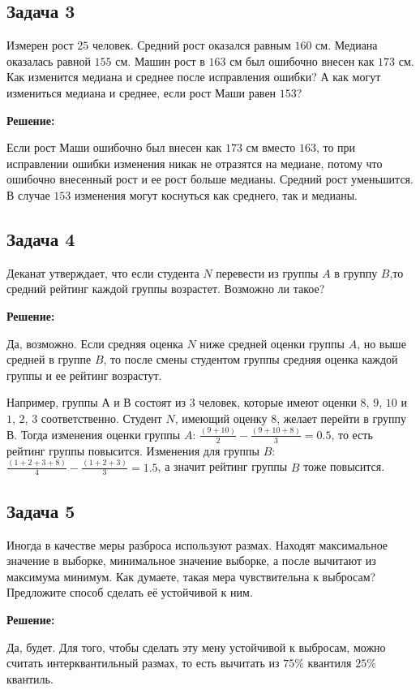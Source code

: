 \documentclass[12pt, a4paper, oneside]{article}
\begin{document}
\subsection*{Задача 3}

Измерен рост $25$ человек. Средний рост оказался равным $160$ см. Медиана оказалась равной $155$ см. Машин рост в $163$ см был ошибочно внесен как $173$ см. Как изменится медиана и среднее после исправления ошибки? А как могут измениться медиана и среднее, если рост Маши равен $153$?

\textbf{Решение:} 

Если рост Маши ошибочно был внесен как $173$ см вместо $163$, то при исправлении ошибки изменения никак не отразятся на медиане, потому что ошибочно внесенный рост и ее рост больше медианы. Средний рост уменьшится. В случае $153$ изменения могут коснуться как среднего, так и медианы. 


\subsection*{Задача 4}

Деканат утверждает, что если студента $N$ перевести из группы $A$ в группу $B$,то средний рейтинг каждой группы возрастет. Возможно ли такое?

\textbf{Решение:} 

Да, возможно. Если средняя оценка $N$ ниже средней оценки группы $A$, но выше средней в группе $B$, то после смены студентом группы средняя оценка каждой группы и ее рейтинг возрастут.

Например, группы $А$ и $В$ состоят из $3$ человек, которые имеют оценки $8$, $9$, $10$ и $1$, $2$, $3$ соответственно. Студент $N$, имеющий оценку $8$, желает перейти в группу $В$. Тогда изменения оценки группы $A$:  $\frac{(9+10)}{2} - \frac{(9+10+8)}{3} = 0.5$, то есть рейтинг группы повысится. Изменения для группы $B$:   $\frac{(1+2+3+8)}{4} - \frac{(1+2+3)}{3} = 1.5$, а значит рейтинг группы $B$ тоже повысится.


\subsection*{Задача 5} 

Иногда в качестве меры разброса используют размах. Находят максимальное значение в выборке, минимальное значение выборке, а после вычитают из максимума минимум. Как думаете, такая мера чувствительна к выбросам? Предложите способ сделать её устойчивой к ним.

\textbf{Решение:} 

Да, будет. Для того, чтобы сделать эту мену устойчивой к выбросам, можно считать интерквантильный размах, то есть вычитать из $75\%$ квантиля $25\%$ квантиль.
\end{document}
